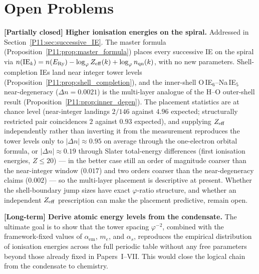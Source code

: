\documentclass[11pt,a4paper]{article}
\theoremstyle{definition}
\theoremstyle{remark}
\newcommand{\vp}{\varphi}
\newcommand{\ERy}{E_{\mathrm{Ry}}}
\newcommand{\aem}{\alpha_{\mathrm{em}}}
\newcommand{\nlvl}[1]{n\!\left(#1\right)}
\newcommand{\IE}{\mathrm{IE}}
\begin{document}
\section{Open Problems}
\label{P11:sec:open}

\begin{enumerate}[label=\textbf{[\arabic*]}, leftmargin=*, noitemsep]

\item \textbf{[Partially closed] Higher ionisation energies on the spiral.}
Addressed in Section~\ref{P11:sec:successive_IE}.
The master formula (Proposition~\ref{P11:prop:master_formula}) places
every successive IE on the spiral via
$\nlvl{\IE_k}=\nlvl{\ERy}-\log_\vp Z_{\rm eff}(k)+\log_\vp n_{\rm qn}(k)$,
with no new parameters.
Shell-completion IEs land near integer tower levels
(Proposition~\ref{P11:prop:shell_completion}), and the inner-shell
O\,IE$_6$--Na\,IE$_5$ near-degeneracy ($\Delta n=0.0021$) is the
multi-layer analogue of the H--O outer-shell result
(Proposition~\ref{P11:prop:inner_degen}).
The placement statistics are at chance level (near-integer landings
$2/146$ against $4.96$ expected; structurally restricted pair
coincidences $2$ against $0.93$ expected), and supplying
$Z_{\rm eff}$ independently rather than inverting it from the
measurement reproduces the tower levels only to
$|\Delta n|\approx0.95$ on average through the one-electron orbital
formula, or $|\Delta n|\approx0.19$ through Slater total-energy
differences (first ionisation energies, $Z\leq20$) --- in the better
case still an order of magnitude coarser than the near-integer window
($0.017$) and two orders coarser than the near-degeneracy claims
($0.002$) --- so the multi-layer placement is
descriptive at present.  Whether the shell-boundary jump sizes have
exact $\vp$-ratio structure, and whether an independent
$Z_{\rm eff}$ prescription can make the placement predictive, remain
open.

\item \textbf{[Long-term] Derive atomic energy levels from the condensate.}
The ultimate goal is to show that the tower spacing $\vp^{-2}$,
combined with the framework-fixed values of $\aem$, $m_e$,
and $\alpha_s$, reproduces the empirical distribution of
ionisation energies across the full periodic table without
any free parameters beyond those already fixed in Papers~I--VII.
This would close the logical chain from the condensate to chemistry.


\end{enumerate}
\end{document}
